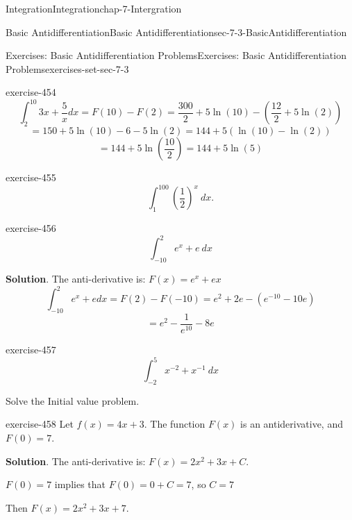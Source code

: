 \documentclass[oneside,10pt,]{book}
\numberwithin{equation}{section}
\begin{document}
\begin{chapterptx}{Integration}{}{Integration}{}{}{chap-7-Intergration}
\begin{sectionptx}{Basic Antidifferentiation}{}{Basic Antidifferentiation}{}{}{sec-7-3-BasicAntidifferentiation}
\begin{exercises-subsection-numberless}{Exercises: Basic Antidifferentiation Problems}{}{Exercises: Basic Antidifferentiation Problems}{}{}{exercises-set-sec-7-3}
\begin{divisionexercise}{9}{}{}{exercise-454}
\begin{equation*}
\int_2^{10} 3x+\frac{5}{x}  dx =F(10)-F(2)
=\frac{300}{2}+5 \ln(10)-\left(\frac{12}{2}+5 \ln(2) \right)
\end{equation*}
%
\begin{equation*}
=150+5 \ln(10)-6-5 \ln(2)=144+5(\ln(10)-\ln(2) )
\end{equation*}
%
\begin{equation*}
= 144+5 \ln\left(\frac{10}{2}\right)=144+5 \ln(5)
\end{equation*}
\end{divisionexercise}%
\begin{divisionexercise}{10}{}{}{exercise-455}%
%
\begin{equation*}
\int_1^{100}\left(\frac{1}{2}\right)^x\   dx.
\end{equation*}
\end{divisionexercise}%
\begin{divisionexercise}{11}{}{}{exercise-456}%
%
\begin{equation*}
\int_{-10}^2 e^x+e \  dx
\end{equation*}
\par\smallskip%
\noindent\textbf{Solution}.\hypertarget{solution-231}{}\quad%
\hypertarget{p-2793}{}%
The anti-derivative is: \(F(x)=e^x+e x\)%
%
\begin{equation*}
\int_{-10}^2 e^x+e  dx =F(2)-F(-10)=e^2+2e-(e^{-10}-10 e)
\end{equation*}
%
\begin{equation*}
= e^2-\frac{1}{e^{10}} -8 e
\end{equation*}
\end{divisionexercise}%
\begin{divisionexercise}{12}{}{}{exercise-457}%
%
\begin{equation*}
\int_{-2}^5 x^{-2}+x^{-1} \  dx
\end{equation*}
\end{divisionexercise}%
\hypertarget{p-2794}{}%
Solve the Initial value problem.%
\begin{divisionexercise}{13}{}{}{exercise-458}%
\hypertarget{p-2795}{}%
Let \(f(x)=4x+3\).  The function \(F(x)\) is an antiderivative, and \(F(0)=7\).%
\par\smallskip%
\noindent\textbf{Solution}.\hypertarget{solution-232}{}\quad%
\hypertarget{p-2796}{}%
The anti-derivative is: \(F(x)=2x^2+3x+C\).%
\par
\hypertarget{p-2797}{}%
\(F(0)= 7\) implies that \(F(0)=0+C=7\), so \(C = 7\)%
\par
\hypertarget{p-2798}{}%
Then \(F(x)=2x^2+3x+7\).%

\end{divisionexercise}
\end{exercises-subsection-numberless}
\end{sectionptx}
\end{chapterptx}
\end{document}
